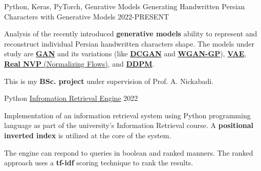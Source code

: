 

\begin{cventries}

  \cventry
    {Python, Keras, PyTorch, Genrative Models} %
    {Generating Handwritten Persian Characters with Generative Models} %
    {} %
    {2022-PRESENT} %
    {
      \begin{cvitems} %
      	\item {Analysis of the recently introduced \textbf{generative models} ability to represent and reconstruct individual Persian handwritten characters shape. The models under study are \href{https://arxiv.org/abs/1406.2661}{\textbf{GAN}} and its variations (like \href{https://arxiv.org/abs/1511.06434}{\textbf{DCGAN}} and \href{https://arxiv.org/abs/1704.00028}{\textbf{WGAN-GP}}), \href{https://arxiv.org/abs/1312.6114}{\textbf{VAE}}, \href{https://arxiv.org/abs/1605.08803}{\textbf{Real NVP} (Normalizing Flows)}, and \href{https://arxiv.org/abs/2006.11239}{\textbf{DDPM}}.}
      	\item {This is my \textbf{BSc. project} under supervision of Prof. A. Nickabadi.}
      \end{cvitems}
    }

  \cventry
    {Python} %
    {\href{https://github.com/radinshayanfar/AUT-IR}{Infromation Retrieval Engine}} %
    {} %
    {2022} %
    {
      \begin{cvitems} %
      	\item {Implementation of an information retrieval system using Python programming language as part of the university's Information Retrieval course. A \textbf{positional inverted index} is utilized at the core of the system.}
      	\item {The engine can respond to queries in boolean and ranked manners. The ranked approach uses a \textbf{tf-idf} scoring technique to rank the results.}
      \end{cvitems}
    }


\end{cventries}
